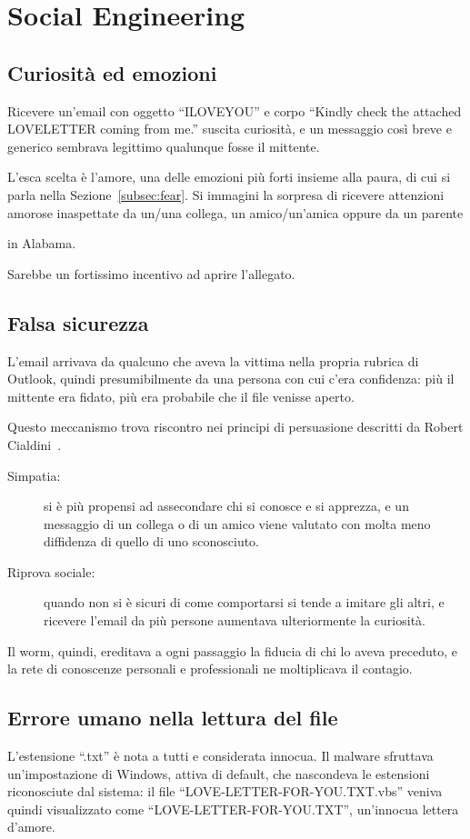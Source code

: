 \section{Social Engineering}\label{sec:SocialEngineering}

\subsection{Curiosità ed emozioni}
Ricevere un'email con oggetto ``ILOVEYOU'' e corpo ``Kindly check the attached LOVELETTER coming from me.'' suscita curiosità, e un messaggio così breve e generico sembrava legittimo qualunque fosse il mittente.

L'esca scelta è l'amore, una delle emozioni più forti insieme alla paura, di cui si parla nella Sezione~\ref{subsec:fear}.
Si immagini la sorpresa di ricevere attenzioni amorose inaspettate da un/una collega, un amico/un'amica oppure da un parente
\begin{joke}
  in Alabama.
\end{joke}
Sarebbe un fortissimo incentivo ad aprire l'allegato.

\subsection{Falsa sicurezza}
L'email arrivava da qualcuno che aveva la vittima nella propria rubrica di Outlook, quindi presumibilmente da una persona con cui c'era confidenza: più il mittente era fidato, più era probabile che il file venisse aperto.

Questo meccanismo trova riscontro nei principi di persuasione descritti da Robert Cialdini~\cite{cialdini1984influence}.
\begin{description}
  \item[Simpatia:] si è più propensi ad assecondare chi si conosce e si apprezza, e un messaggio di un collega o di un amico viene valutato con molta meno diffidenza di quello di uno sconosciuto.
  \item[Riprova sociale:] quando non si è sicuri di come comportarsi si tende a imitare gli altri, e ricevere l'email da più persone aumentava ulteriormente la curiosità.
\end{description}

Il worm, quindi, ereditava a ogni passaggio la fiducia di chi lo aveva preceduto, e la rete di conoscenze personali e professionali ne moltiplicava il contagio.

\subsection{Errore umano nella lettura del file}\label{subsec:estensione}
L'estensione ``.txt'' è nota a tutti e considerata innocua.
Il malware sfruttava un'impostazione di Windows, attiva di default, che nascondeva le estensioni riconosciute dal sistema: il file ``LOVE-LETTER-FOR-YOU.TXT.vbs'' veniva quindi visualizzato come ``LOVE-LETTER-FOR-YOU.TXT'', un'innocua lettera d'amore.

